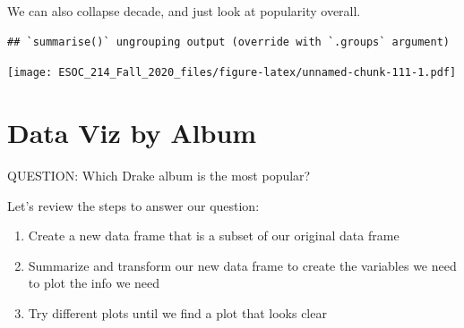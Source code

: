 \documentclass[
]{book}
\newenvironment{Shaded}{\begin{snugshade}}{\end{snugshade}}
\newcommand{\DataTypeTok}[1]{\textcolor[rgb]{0.13,0.29,0.53}{#1}}
\newcommand{\DecValTok}[1]{\textcolor[rgb]{0.00,0.00,0.81}{#1}}
\newcommand{\KeywordTok}[1]{\textcolor[rgb]{0.13,0.29,0.53}{\textbf{#1}}}
\newcommand{\NormalTok}[1]{#1}
\newcommand{\OperatorTok}[1]{\textcolor[rgb]{0.81,0.36,0.00}{\textbf{#1}}}
\newcommand{\StringTok}[1]{\textcolor[rgb]{0.31,0.60,0.02}{#1}}
\begin{document}
We can also collapse decade, and just look at popularity overall.

\begin{Shaded}
\end{Shaded}

\begin{verbatim}
## `summarise()` ungrouping output (override with `.groups` argument)
\end{verbatim}

\texttt{[image: ESOC\_214\_Fall\_2020\_files/figure-latex/unnamed-chunk-111-1.pdf]}

\hypertarget{data-viz-by-album}{%
\section{Data Viz by Album}\label{data-viz-by-album}}

QUESTION: Which Drake album is the most popular?

Let's review the steps to answer our question:

\begin{enumerate}
\def\labelenumi{\arabic{enumi})}
\item
  Create a new data frame that is a subset of our original data frame
\item
  Summarize and transform our new data frame to create the variables we need to plot the info we need
\item
  Try different plots until we find a plot that looks clear
\end{enumerate}
\end{document}
